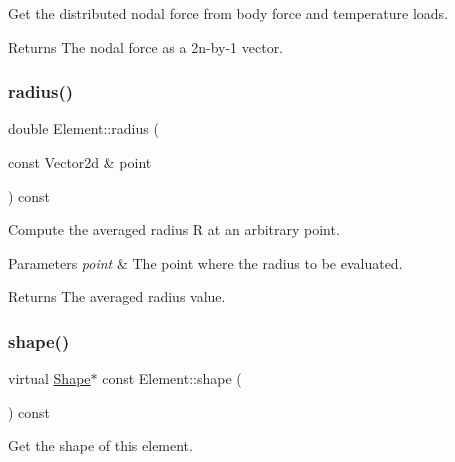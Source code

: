 Get the distributed nodal force from body force and temperature loads. 

\begin{DoxyReturn}{Returns}
The nodal force as a 2n-\/by-\/1 vector. 
\end{DoxyReturn}
\mbox{\label{class_element_abab2c4f446d46785abcdfd17777e80d4}} 
\subsubsection{\texorpdfstring{radius()}{radius()}}
{\footnotesize\ttfamily double Element\+::radius (\begin{DoxyParamCaption}\item[{const Vector2d \&}]{point }\end{DoxyParamCaption}) const}



Compute the averaged radius R at an arbitrary point. 


\begin{DoxyParams}{Parameters}
{\em point} & The point where the radius to be evaluated. \\
\hline
\end{DoxyParams}
\begin{DoxyReturn}{Returns}
The averaged radius value. 
\end{DoxyReturn}
\mbox{\label{class_element_aadc36f89fa5f11da7e74d6528ecdcacc}} 
\subsubsection{\texorpdfstring{shape()}{shape()}}
{\footnotesize\ttfamily virtual \mbox{\hyperlink{class_shape}{Shape}}$\ast$ const Element\+::shape (\begin{DoxyParamCaption}{ }\end{DoxyParamCaption}) const\hspace{0.3cm}{\ttfamily [pure virtual]}}



Get the shape of this element. 


